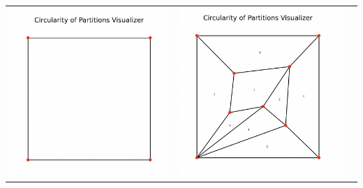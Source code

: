 \documentclass[11pt]{article}
\begin{document}
\begin{center}
    \begin{tabular}{c c c}
      \includegraphics[scale=0.33]{SetupScreen.png} &
      \includegraphics[scale=0.33]{UserPartition.png} &

\end{tabular}
\end{center}
\end{document}

